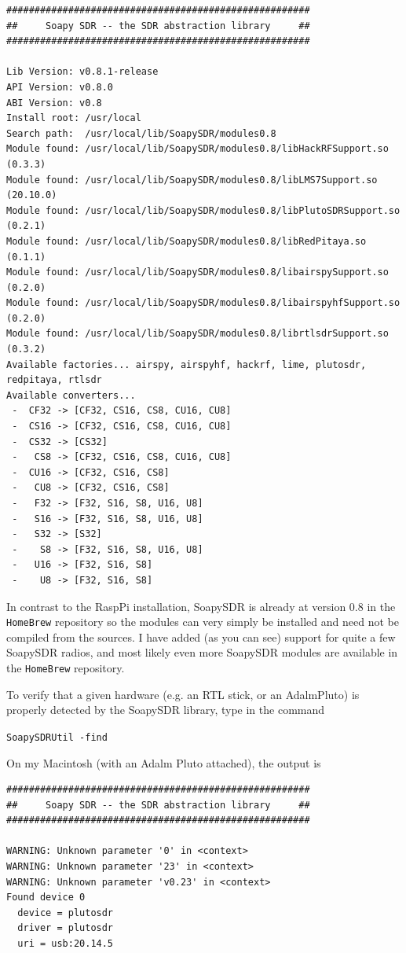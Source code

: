 \documentclass[12pt]{book}
\def\grtt#1{\texttt{\color{magenta}#1}}
\begin{document}
\begin{tiny}
\begin{verbatim}
######################################################
##     Soapy SDR -- the SDR abstraction library     ##
######################################################

Lib Version: v0.8.1-release
API Version: v0.8.0
ABI Version: v0.8
Install root: /usr/local
Search path:  /usr/local/lib/SoapySDR/modules0.8
Module found: /usr/local/lib/SoapySDR/modules0.8/libHackRFSupport.so   (0.3.3)
Module found: /usr/local/lib/SoapySDR/modules0.8/libLMS7Support.so     (20.10.0)
Module found: /usr/local/lib/SoapySDR/modules0.8/libPlutoSDRSupport.so (0.2.1)
Module found: /usr/local/lib/SoapySDR/modules0.8/libRedPitaya.so       (0.1.1)
Module found: /usr/local/lib/SoapySDR/modules0.8/libairspySupport.so   (0.2.0)
Module found: /usr/local/lib/SoapySDR/modules0.8/libairspyhfSupport.so (0.2.0)
Module found: /usr/local/lib/SoapySDR/modules0.8/librtlsdrSupport.so   (0.3.2)
Available factories... airspy, airspyhf, hackrf, lime, plutosdr, redpitaya, rtlsdr
Available converters...
 -  CF32 -> [CF32, CS16, CS8, CU16, CU8]
 -  CS16 -> [CF32, CS16, CS8, CU16, CU8]
 -  CS32 -> [CS32]
 -   CS8 -> [CF32, CS16, CS8, CU16, CU8]
 -  CU16 -> [CF32, CS16, CS8]
 -   CU8 -> [CF32, CS16, CS8]
 -   F32 -> [F32, S16, S8, U16, U8]
 -   S16 -> [F32, S16, S8, U16, U8]
 -   S32 -> [S32]
 -    S8 -> [F32, S16, S8, U16, U8]
 -   U16 -> [F32, S16, S8]
 -    U8 -> [F32, S16, S8]
\end{verbatim}
\end{tiny}

In contrast to the RaspPi
installation, SoapySDR is already at version 0.8 in the \texttt{HomeBrew} repository so
the modules can very simply be installed and need not be compiled from the sources.
I have added (as you can see) support for quite a few SoapySDR radios, and most
likely even more SoapySDR modules are available in the \texttt{HomeBrew} repository.

\clearpage
To verify that a given hardware (e.g. an RTL stick, or an AdalmPluto) is properly detected by the
SoapySDR library, type in the command

\grtt{SoapySDRUtil -find}

On my Macintosh (with an Adalm Pluto attached), the output is

\begin{small}
\begin{verbatim}
######################################################
##     Soapy SDR -- the SDR abstraction library     ##
######################################################

WARNING: Unknown parameter '0' in <context>
WARNING: Unknown parameter '23' in <context>
WARNING: Unknown parameter 'v0.23' in <context>
Found device 0
  device = plutosdr
  driver = plutosdr
  uri = usb:20.14.5
\end{verbatim}
\end{small}
\end{document}
